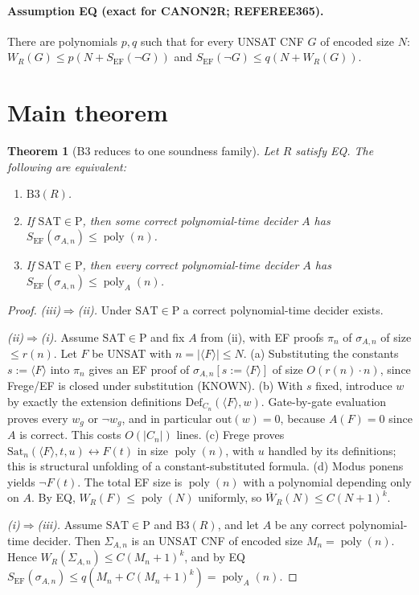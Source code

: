 \documentclass[11pt]{article}
\newtheorem{theorem}{Theorem}
\newcommand{\SAT}{\mathrm{SAT}}
\newcommand{\Wbar}{\overline W}
\newcommand{\EF}{\mathrm{EF}}
\newcommand{\poly}{\operatorname{poly}}
\begin{document}
\paragraph{Assumption EQ (exact for CANON2R; REFEREE365).}
There are polynomials $p,q$ such that for every UNSAT CNF $G$ of encoded size $N$:
$W_R(G)\le p(N+S_{\EF}(\neg G))$ and $S_{\EF}(\neg G)\le q(N+W_R(G))$.

\section{Main theorem}
\begin{theorem}[B3 reduces to one soundness family]\label{thm:main}
Let $R$ satisfy EQ. The following are equivalent:
\begin{enumerate}
\item[(i)] $\mathrm{B3}(R)$.
\item[(ii)] If $\SAT\in\mathrm P$, then \emph{some} correct polynomial-time decider $A$ has
$S_{\EF}(\sigma_{A,n})\le\poly(n)$.
\item[(iii)] If $\SAT\in\mathrm P$, then \emph{every} correct polynomial-time decider $A$
has $S_{\EF}(\sigma_{A,n})\le\poly_A(n)$.
\end{enumerate}
\end{theorem}

\begin{proof}
\emph{(iii)$\Rightarrow$(ii).} Under $\SAT\in\mathrm P$ a correct polynomial-time
decider exists.

\emph{(ii)$\Rightarrow$(i).} Assume $\SAT\in\mathrm P$ and fix $A$ from (ii), with
EF proofs $\pi_n$ of $\sigma_{A,n}$ of size $\le r(n)$. Let $F$ be UNSAT with
$n=|\langle F\rangle|\le N$. (a) Substituting the constants $s:=\langle F\rangle$
into $\pi_n$ gives an EF proof of $\sigma_{A,n}[s:=\langle F\rangle]$ of size
$O(r(n)\cdot n)$, since Frege/EF is closed under substitution (KNOWN). (b) With
$s$ fixed, introduce $w$ by exactly the extension definitions
$\mathrm{Def}_{C_n}(\langle F\rangle,w)$. Gate-by-gate evaluation proves every
$w_g$ or $\neg w_g$, and in particular $\mathrm{out}(w)=0$, because $A(F)=0$
since $A$ is correct. This costs $O(|C_n|)$ lines. (c) Frege proves
$\mathrm{Sat}_n(\langle F\rangle,t,u)\leftrightarrow F(t)$ in size $\poly(n)$,
with $u$ handled by its definitions; this is structural unfolding of a
constant-substituted formula. (d) Modus ponens yields $\neg F(t)$. The total EF
size is $\poly(n)$ with a polynomial depending only on $A$. By EQ,
$W_R(F)\le\poly(N)$ uniformly, so $\Wbar_R(N)\le C(N+1)^k$.

\emph{(i)$\Rightarrow$(iii).} Assume $\SAT\in\mathrm P$ and $\mathrm{B3}(R)$, and let
$A$ be any correct polynomial-time decider. Then $\Sigma_{A,n}$ is an UNSAT CNF of
encoded size $M_n=\poly(n)$. Hence $W_R(\Sigma_{A,n})\le C(M_n+1)^k$, and by EQ
$S_{\EF}(\sigma_{A,n})\le q(M_n+C(M_n+1)^k)=\poly_A(n)$.
\end{proof}
\end{document}

